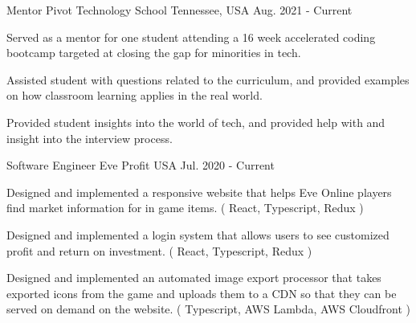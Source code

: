 

\begin{cventries}

  \cventry
    {Mentor} %
    {Pivot Technology School} %
    {Tennessee, USA} %
    {Aug. 2021 - Current} %
    {
      \begin{cvitems} %
        \item {Served as a mentor for one student attending a 16 week accelerated coding bootcamp targeted at closing the gap for minorities in tech.}
        \item {Assisted student with questions related to the curriculum, and provided examples on how classroom learning applies in the real world.}
        \item {Provided student insights into the world of tech, and provided help with and insight into the interview process.}
      \end{cvitems}
    }

  \cventry
    {Software Engineer} %
    {Eve Profit} %
    {USA} %
    {Jul. 2020 - Current} %
    {
      \begin{cvitems} %
        \item {Designed and implemented a responsive website that helps Eve Online players find market information for in game items. ( React, Typescript, Redux )}
        \item {Designed and implemented a login system that allows users to see customized profit and return on investment. ( React, Typescript, Redux )}
        \item {Designed and implemented an automated image export processor that takes exported icons from the game and uploads them to a CDN so that they can be served on demand on the website. ( Typescript, AWS Lambda, AWS Cloudfront )}
      \end{cvitems}
    }


\end{cventries}

